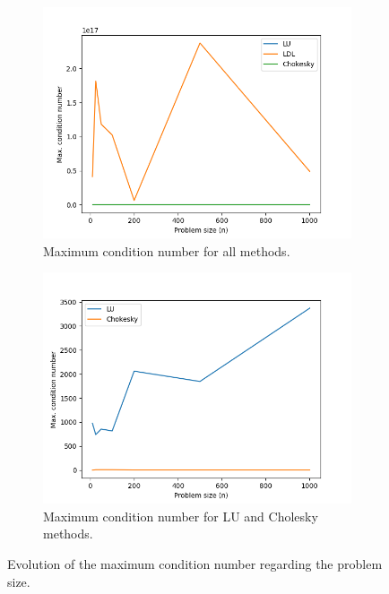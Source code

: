 \documentclass[11pt,a4paper]{article}
\begin{document}
\begin{figure}[H]
  \centering
  \begin{subfigure}[t]{0.5\textwidth}
    \centering
    \includegraphics[scale=0.4]{img/max_cond_num_all}
    \caption{Maximum condition number for all methods.}
  \end{subfigure}%
  \begin{subfigure}[t]{0.5\textwidth}
    \centering
    \includegraphics[scale=0.4]{img/max_cond_num_lu_cho}
    \caption{Maximum condition number for LU and Cholesky methods.}
  \end{subfigure}
  \caption{Evolution of the maximum condition number regarding the problem size.}
  \label{fig:max-cond-number}
\end{figure}
\end{document}
